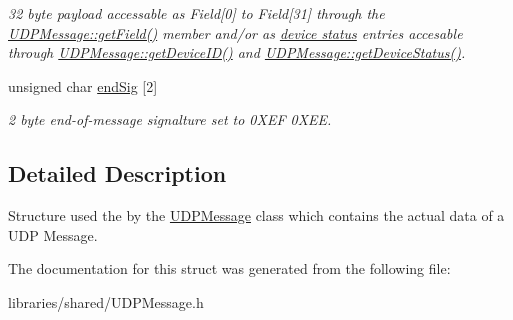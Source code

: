 \begin{DoxyCompactItemize}
\begin{DoxyCompactList}\small\item\em 32 byte payload accessable as Field\mbox{[}0\mbox{]} to Field\mbox{[}31\mbox{]} through the \hyperlink{class_u_d_p_message_a869585e0916d3b9edf99111f8fc74709}{U\+D\+P\+Message\+::get\+Field()} member and/or as \hyperlink{struct_message_device_struct}{device status} entries accesable through \hyperlink{class_u_d_p_message_a83b544583226eb4e6b51237c9f350e0f}{U\+D\+P\+Message\+::get\+Device\+I\+D()} and \hyperlink{class_u_d_p_message_acc249c0f6c658bc56c2161946715eb22}{U\+D\+P\+Message\+::get\+Device\+Status()}. \end{DoxyCompactList}\item 
\mbox{\label{struct_u_d_p_message_struct_a68c8ce1a9f79ecb4b3955eaf98a4781c}} 
unsigned char \hyperlink{struct_u_d_p_message_struct_a68c8ce1a9f79ecb4b3955eaf98a4781c}{end\+Sig} \mbox{[}2\mbox{]}
\begin{DoxyCompactList}\small\item\em 2 byte end-\/of-\/message signalture set to 0\+X\+EF 0\+X\+EE. \end{DoxyCompactList}\end{DoxyCompactItemize}


\subsection{Detailed Description}
Structure used the by the \hyperlink{class_u_d_p_message}{U\+D\+P\+Message} class which contains the actual data of a U\+DP Message. 

The documentation for this struct was generated from the following file\+:\begin{DoxyCompactItemize}
\item 
libraries/shared/U\+D\+P\+Message.\+h\end{DoxyCompactItemize}
